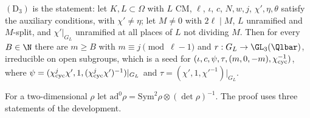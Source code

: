 \begin{definition}\label{pf:eis:densestmt}
$(\mathrm{D}_3)$ is the statement: let $K,L\subset\Omega$ with $L$ CM, $\ell$, $\iota$, $c$, $N,w,j$, $\chi',\eta,\theta$ satisfy the auxiliary
conditions, with $\chi'\ne\eta$; let $M\ne0$ with $2\ell\mid M$, $L$ unramified and $M$-split, and $\chi'|_{G_L}$ unramified at all places of $L$
not dividing $M$. Then for every $B\in\N$ there are $m\ge B$ with $m\equiv j\pmod{\ell-1}$ and $r:G_L\to\GL_3(\Qlbar)$, irreducible on open
subgroups, which is a seed for $(\iota,c,\psi,\tau,(m,0,-m),\chi_{\mathrm{cyc}}^{-1})$, where $\psi=(\chi_{\mathrm{cyc}}^j\chi',1,(\chi_{\mathrm{cyc}}^j\chi')^{-1})|_{G_L}$ and
$\tau=(\chi',1,\chi'^{-1})|_{G_L}$.
\end{definition}

For a two-dimensional $\rho$ let $\mathrm{ad}^0\rho=\mathrm{Sym}^2\rho\otimes(\det\rho)^{-1}$. The proof uses three statements of the
development.


